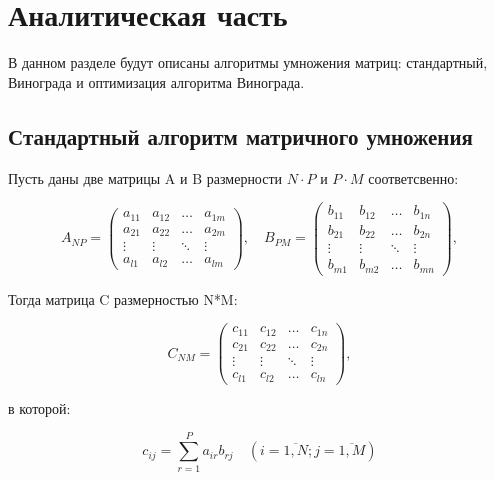 \chapter{Аналитическая часть}

В данном разделе будут описаны алгоритмы умножения матриц: стандартный, Винограда и оптимизация алгоритма Винограда.

\section{Стандартный алгоритм матричного умножения}

Пусть даны две матрицы A и B размерности $N \cdot P$ и $P \cdot M$ соответсвенно:

\begin{equation}
	A_{NP} = \begin{pmatrix}
		a_{11} & a_{12} & \ldots & a_{1m}\\
		a_{21} & a_{22} & \ldots & a_{2m}\\
		\vdots & \vdots & \ddots & \vdots\\
		a_{l1} & a_{l2} & \ldots & a_{lm}
	\end{pmatrix},
	\quad
	B_{PM} = \begin{pmatrix}
		b_{11} & b_{12} & \ldots & b_{1n}\\
		b_{21} & b_{22} & \ldots & b_{2n}\\
		\vdots & \vdots & \ddots & \vdots\\
		b_{m1} & b_{m2} & \ldots & b_{mn}
	\end{pmatrix},
\end{equation}

Тогда матрица C размерностью N*M:

\begin{equation}
	C_{NM} = \begin{pmatrix}
		c_{11} & c_{12} & \ldots & c_{1n}\\
		c_{21} & c_{22} & \ldots & c_{2n}\\
		\vdots & \vdots & \ddots & \vdots\\
		c_{l1} & c_{l2} & \ldots & c_{ln}
	\end{pmatrix},
\end{equation}

в которой:

\begin{equation}
	\label{eq:M}
	c_{ij} = \sum_{r=1}^{P} a_{ir}b_{rj} \quad (i=\overline{1,N}; j=\overline{1,M})
\end{equation}

